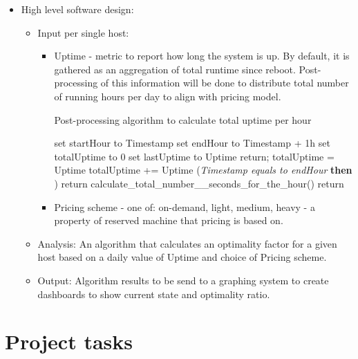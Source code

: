 \documentclass[11pt]{artikel3}
\begin{document}
\begin{itemize}
\item High level software design:
\begin{itemize}
\item Input per single host: 
	\begin{itemize}
	\item Uptime - metric to report how long the system is up. By default, it is gathered as an aggregation of total runtime since reboot. Post-processing of this information will be done to distribute total number of running hours per day to align with pricing model.

	Post-processing algorithm to calculate total uptime per hour

	\begin{algorithm}[H]
 		 {
 			set startHour to Timestamp\;
 			set endHour to Timestamp + 1h\;
 			set totalUptime to 0\;
 			set lastUptime to Uptime\;
 			return;
 		}
 		 {
 			 {
 				totalUptime = Uptime\;
 			}
 			{
 				totalUptime += Uptime\;
 			}
 		} (\textsl{Timestamp equals to endHour} \textbf{then} )
 		{
 			return calculate\_total\_number\_\of\_seconds\_for\_the\_hour()\;
 		}
 		return\;
 	
 \caption{Post-processing of uptime raw data}
\end{algorithm}

	\item Pricing scheme - one of: on-demand, light, medium, heavy - a property of reserved machine that pricing is based on.
	\end{itemize}
\item Analysis: An algorithm that calculates an optimality factor for a given host based on a daily value of Uptime and choice of Pricing scheme.
\item Output: Algorithm results to be send to a graphing system to create dashboards to show current state and optimality ratio.
\end{itemize}
\end{itemize}

\section{Project tasks}
\end{document}
